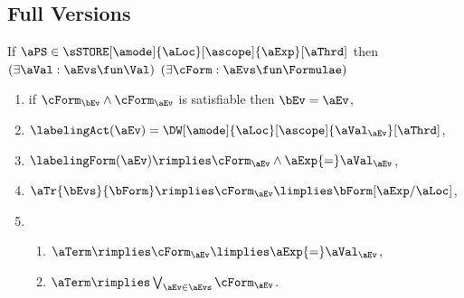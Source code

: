 
\subsection{Full Versions}

If $\aPS \in \sSTORE[\amode]{\aLoc}[\ascope]{\aExp}[\aThrd]$ then
$(\exists\aVal:\aEvs\fun\Val)$
$(\exists\cForm:\aEvs\fun\Formulae)$
\begin{multicols}{2}
  \begin{enumerate}[topsep=0pt,label=(\textsc{w}\arabic*),ref=\textsc{w}\arabic*]
  \item \label{write-E-x}
    if $\cForm_\bEv\land\cForm_\aEv$ is satisfiable then $\bEv=\aEv$,
  \item \label{write-lambda-x}
    $\labelingAct(\aEv) = \DW[\amode]{\aLoc}[\ascope]{\aVal_\aEv}[\aThrd]$,
  \item \label{write-kappa-x}
    \begin{math}
      \labelingForm(\aEv) \rimplies
      \cForm_\aEv
      \land \aExp{=}\aVal_\aEv
    \end{math},
    
    
  \item \label{write-tau-x}
    \begin{math}
      \aTr{\bEvs}{\bForm} \rimplies 
      \cForm_\aEv
      \limplies 
      \bForm[\aExp/\aLoc]
    \end{math},
  \item[] 
    \begin{enumerate}[leftmargin=0pt]
    \item \label{write-term-nonempty-x}
      $\aTerm \rimplies \cForm_\aEv \limplies \aExp{=}\aVal_\aEv$,
    \item \label{write-term-empty-x}
      $\aTerm \rimplies \bigvee_{\aEv\in\aEvs}\cForm_\aEv$.
    \end{enumerate}
  \end{enumerate}
\end{multicols}

